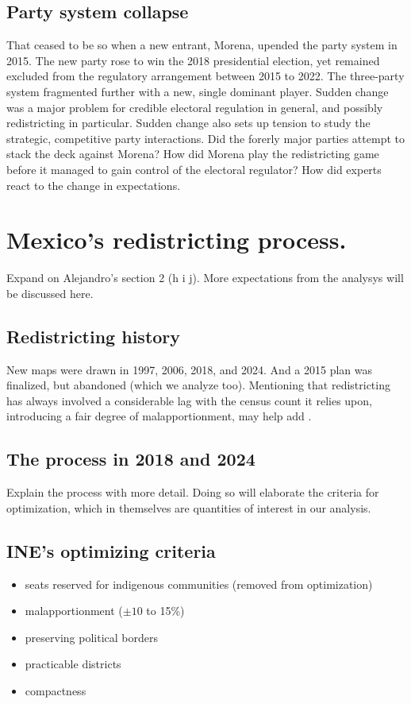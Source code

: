 \documentclass[12pt]{article}
\begin{document}
\subsection{Party system collapse}
\label{sec:orgcf57d36}
That ceased to be so when a new entrant, Morena, upended the party system in 2015. The new party rose to win the 2018 presidential election, yet remained excluded from the regulatory arrangement between 2015 to 2022. The three-party system fragmented further with a new, single dominant player. Sudden change was a major problem for credible electoral regulation in general, and possibly redistricting in particular. Sudden change also sets up tension to study the strategic, competitive party interactions. Did the forerly major parties attempt to stack the deck against Morena? How did Morena play the redistricting game before it managed to gain control of the electoral regulator? How did experts react to the change in expectations. 
\section{Mexico's redistricting process.}
\label{sec:org4ecee07}
Expand on Alejandro's section 2 (h i j). More expectations from the analysys will be discussed here.
\subsection{Redistricting history}
\label{sec:orgf4b1276}
New maps were drawn in 1997, 2006, 2018, and 2024. And a 2015 plan was finalized, but abandoned (which we analyze too). Mentioning that redistricting has always involved a considerable lag with the census count it relies upon, introducing a fair degree of malapportionment, may help add . 
\subsection{The process in 2018 and 2024}
\label{sec:orgbf17ac6}
Explain the process with more detail. Doing so will elaborate the criteria for optimization, which in themselves are quantities of interest in our analysis.
\subsection{INE's optimizing criteria}
\label{sec:orgd1100ce}
\begin{itemize}
\item seats reserved for indigenous communities (removed from optimization)
\item malapportionment (\(\pm 10\) to 15\%)
\item preserving political borders
\item practicable districts
\item compactness
\end{itemize}
\end{document}
